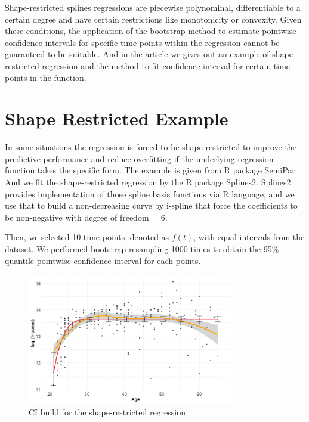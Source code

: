 \documentclass[12pt]{article}
\begin{document}
Shape-restricted splines regressions are piecewise polynominal, differentiable to a certain degree and have certain restrictions like monotonicity or convexity. Given these conditions, the application of the bootstrap method to estimate pointwise confidence intervals for specific time points within the regression cannot be guaranteed to be suitable. And in the article we gives out an example of shape-restricted regression and the method to fit confidence interval for certain time points in the function.









\section{Shape Restricted Example}
\label{Shape Restricted Example}

In some situations the regression is forced to be shape-restricted to improve the predictive performance and reduce overfitting if the underlying regression function takes the specific form. The example is given from R package SemiPar. And we fit the shape-restricted regression by the R package Splines2. Splines2 provides implementation of those spline basis functions via R language, and we use that to build a non-decreasing curve by i-spline that force the coefficients to be non-negative with degree of freedom = 6.

Then, we selected 10 time points, denoted as $f(t)$, with equal intervals from the dataset. We performed bootstrap resampling 1000 times to obtain the 95\% quantile pointwise confidence interval for each points.

\begin{figure}[H]
  \centering
  \includegraphics[width=0.8\textwidth]{SemiparCI.png}
  \caption{CI build for the shape-restricted regression}
  \label{fig:semipar}
\end{figure}
\end{document}
